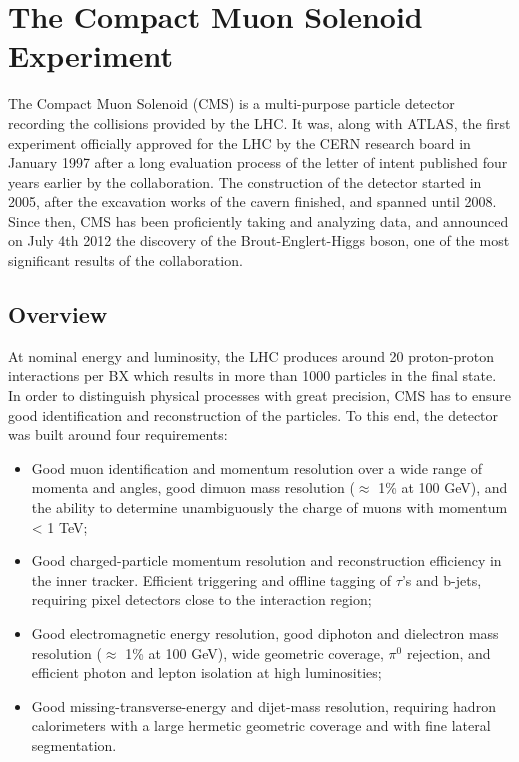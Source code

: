 \chapter{The Compact Muon Solenoid Experiment}
\label{chap:I-3-cms}

	The Compact Muon Solenoid (CMS) \cite{1748-0221-3-08-S08004} is a multi-purpose particle detector recording the collisions provided by the LHC. It was, along with ATLAS, the first experiment officially approved for the LHC by the CERN research board in January 1997 after a long evaluation process of the letter of intent published four years earlier by the collaboration. The construction of the detector started in 2005, after the excavation works of the cavern finished, and spanned until 2008. Since then, CMS has been proficiently taking and analyzing data, and announced on July 4th 2012 the discovery of the Brout-Englert-Higgs boson, one of the most significant results of the collaboration.

  \section{Overview}

    At nominal energy and luminosity, the LHC produces around 20 proton-proton interactions per BX which results in more than 1000 particles in the final state. In order to distinguish physical processes with great precision, CMS has to ensure good identification and reconstruction of the particles. To this end, the detector was built around four requirements:
    \begin{itemize}
      \item Good muon identification and momentum resolution over a wide range of momenta and angles, good dimuon mass resolution ($ \approx $ 1\% at 100 GeV), and the ability to determine unambiguously the charge of muons with momentum < 1 TeV;
      \item Good charged-particle momentum resolution and reconstruction efficiency in the inner tracker. Efficient triggering and offline tagging of $ \tau $'s and b-jets, requiring pixel detectors close to the interaction region;
      \item Good electromagnetic energy resolution, good diphoton and dielectron mass resolution ($ \approx $ 1\% at 100 GeV), wide geometric coverage, $ \pi^0 $ rejection, and efficient photon and lepton isolation at high luminosities;
      \item Good missing-transverse-energy and dijet-mass resolution, requiring hadron calorimeters with a large hermetic geometric coverage and with fine lateral segmentation. \\
    \end{itemize}

